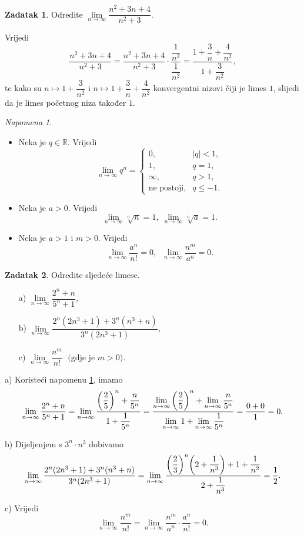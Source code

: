 \documentclass{book}
\let\originalleft\left
\let\originalright\right
\renewcommand{\left}{\mathopen{}\mathclose\bgroup\originalleft}
\renewcommand{\right}{\aftergroup\egroup\originalright}
\renewenvironment{proof}{%
    \vspace{-\parskip}\begin{oldproof}%
    }{%
    \end{oldproof}%
}
\theoremstyle{definition}
\theoremstyle{definition}
\newtheorem{exercise}{Zadatak}
\theoremstyle{remark}
\newtheorem{remark}{Napomena}
\begin{document}
\begin{exercise}
Odredite $\lim\limits_{n\to \infty}{\dfrac{n^2+3n+4}{n^2+3}}$.
\end{exercise}
\begin{proof}[Rješenje]
Vrijedi
$$\dfrac{n^2+3n+4}{n^2+3}=\dfrac{n^2+3n+4}{n^2+3}\cdot \dfrac{\dfrac{1}{n^2}}{\dfrac{1}{n^2}}=\dfrac{1+\dfrac{3}{n}+\dfrac{4}{n^2}}{1+\dfrac{3}{n^2}},$$
te kako su $n\mapsto 1+\dfrac{3}{n^2}$ i $n\mapsto 1+\dfrac{3}{n}+\dfrac{4}{n^2}$ konvergentni nizovi čiji je limes $1$, slijedi da je limes početnog niza također $1$.
\end{proof}
\begin{remark} \textbf{}
\label{importantlimits}
\begin{itemize}
\item Neka je $q\in \mathbb{R}$. Vrijedi
$$\lim\limits_{n\to \infty}{q^n}=\begin{cases}
0, & |q|<1,\\
1, & q=1,\\
\infty, & q>1,\\
\text{ne postoji}, & q\leq -1.
\end{cases}$$
\item Neka je $a>0$. Vrijedi
$$\lim\limits_{n\to \infty}{\sqrt[n]{n}}=1,\;\lim\limits_{n\to \infty}{\sqrt[n]{a}}=1.$$
\item Neka je $a>1$ i $m>0$. Vrijedi
$$\lim\limits_{n\to \infty}{\dfrac{a^n}{n!}}=0,\;\; \lim\limits_{n\to \infty}{\dfrac{n^m}{a^n}}=0.$$
\end{itemize}
\end{remark}
\begin{exercise} Odredite sljedeće limese.
\begin{itemize}
\item[a)] $\lim\limits_{n\to \infty}{\dfrac{2^n+n}{5^n+1}}$,
\item[b)] $\lim\limits_{n\to \infty}{\dfrac{2^n(2n^3+1)+3^n(n^3+n)}{3^n(2n^3+1)}}$,
\item[c)] $\lim\limits_{n\to \infty}{\dfrac{n^m}{n!}}\;\text{ (gdje je } m>0\text{)}$.
\end{itemize}
\end{exercise}
\begin{proof}[Rješenje]
a) Koristeći napomenu \ref{importantlimits}, imamo
$$\lim\limits_{n\to \infty}{\dfrac{2^n+n}{5^n+1}}=\lim\limits_{n\to \infty}{\dfrac{\left(\dfrac{2}{5}\right)^n+\dfrac{n}{5^n}}{1+\dfrac{1}{5^n}}}=\dfrac{\lim\limits_{n\to \infty}{\left(\dfrac{2}{5}\right)^n}+\lim\limits_{n\to \infty}{\dfrac{n}{5^n}}}{\lim\limits_{n\to \infty}{1}+\lim\limits_{n\to \infty}{\dfrac{1}{5^n}}}=\dfrac{0+0}{1}=0.$$

b) Dijeljenjem s $3^n\cdot n^3$ dobivamo
$$\lim\limits_{n\to \infty}{\dfrac{2^n(2n^3+1)+3^n(n^3+n)}{3^n(2n^3+1)}}=\lim\limits_{n\to \infty}{\dfrac{\left(\dfrac{2}{3}\right)^n\left(2 + \dfrac{1}{n^{3}}\right)+1 + \dfrac{1}{n^{2}}}{2 + \dfrac{1}{n^{3}}}}=\dfrac{1}{2}.$$

c) Vrijedi
$$\lim\limits_{n\to \infty}{\dfrac{n^m}{n!}}=\lim\limits_{n\to \infty}{\dfrac{n^m}{a^n}\cdot \dfrac{a^n}{n!}}=0.$$
\end{proof}
\end{document}
